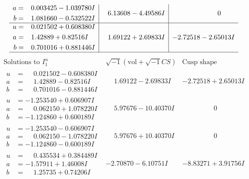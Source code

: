 \documentclass[1p]{elsarticle_modified}
\theoremstyle{definition}
\newcommand{\I}{\sqrt{-1}}
\begin{document}
$$\begin{array}{c|c|c}
\begin{aligned}
a &= \phantom{-}0.003425 - 1.039780 I \\
b &= \phantom{-}1.081660 - 0.532522 I\end{aligned}
 & \phantom{-}6.13608 - 4.49586 I & \phantom{-0.000000 } 0 \\ \hline\begin{aligned}
u &= \phantom{-}0.021502 + 0.608380 I \\
a &= \phantom{-}1.42889 + 0.82516 I \\
b &= \phantom{-}0.701016 + 0.881446 I\end{aligned}
 & \phantom{-}1.69122 + 2.69833 I & -2.72518 - 2.65013 I\\
 \hline 
 \end{array}$$\newpage$$\begin{array}{c|c|c}  
\text{Solutions to }I^u_{1}& \I (\text{vol} + \sqrt{-1}CS) & \text{Cusp shape}\\
 \hline 
\begin{aligned}
u &= \phantom{-}0.021502 - 0.608380 I \\
a &= \phantom{-}1.42889 - 0.82516 I \\
b &= \phantom{-}0.701016 - 0.881446 I\end{aligned}
 & \phantom{-}1.69122 - 2.69833 I & -2.72518 + 2.65013 I \\ \hline\begin{aligned}
u &= -1.253540 + 0.606907 I \\
a &= \phantom{-}0.062150 + 1.078220 I \\
b &= -1.124860 + 0.600189 I\end{aligned}
 & \phantom{-}5.97676 - 10.40370 I & \phantom{-0.000000 } 0 \\ \hline\begin{aligned}
u &= -1.253540 - 0.606907 I \\
a &= \phantom{-}0.062150 - 1.078220 I \\
b &= -1.124860 - 0.600189 I\end{aligned}
 & \phantom{-}5.97676 + 10.40370 I & \phantom{-0.000000 } 0 \\ \hline\begin{aligned}
u &= \phantom{-}0.435534 + 0.384489 I \\
a &= -1.57911 + 1.46008 I \\
b &= \phantom{-}1.25735 + 0.74206 I\end{aligned}
 & -2.70870 - 6.10751 I & -8.83271 + 3.91756 I \\ \hline\begin{aligned}

\end{aligned}
\end{array}$$
\end{document}
